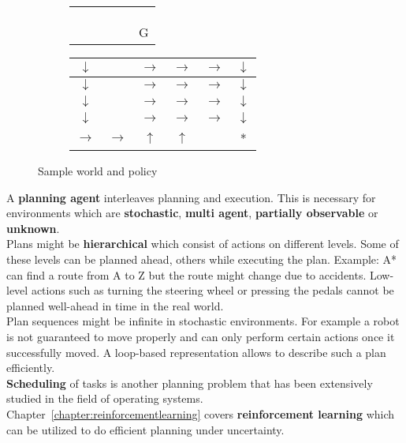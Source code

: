 \documentclass{report}
\begin{document}
\begin{figure}[h!]
\centering
\begin{subfigure}[b]{0.3\textwidth}
\begin{tabular}{|c|c|c|c|c|c|}
\hline
&\cellcolor{black}&&&& \\
\hline
&\cellcolor{black}&&&& \\
\hline
&\cellcolor{black}&&&& \\
\hline
&\cellcolor{black}&&&& \\
\hline
&&&&\cellcolor{black}&G \\
\hline
\end{tabular}
\end{subfigure}
\begin{subfigure}[b]{0.3\textwidth}
\begin{tabular}{|c|c|c|c|c|c|}
\hline
$\downarrow$&&$\rightarrow$&$\rightarrow$&$\rightarrow$&$\downarrow$ \\
\hline
$\downarrow$&&$\rightarrow$&$\rightarrow$&$\rightarrow$&$\downarrow$ \\
\hline
$\downarrow$&&$\rightarrow$&$\rightarrow$&$\rightarrow$&$\downarrow$ \\
\hline
$\downarrow$&&$\rightarrow$&$\rightarrow$&$\rightarrow$&$\downarrow$ \\
\hline
$\rightarrow$&$\rightarrow$&$\uparrow$&$\uparrow$&&* \\
\hline
\end{tabular}
\end{subfigure}
\caption{Sample world and policy}
\label{ref:policy}
\end{figure}

A {\bf planning agent} interleaves planning and execution.
This is necessary for environments which are {\bf stochastic}, {\bf multi agent}, {\bf partially observable} or {\bf unknown}. \\
Plans might be {\bf hierarchical} which consist of actions on different levels. Some of these levels can be planned ahead, others while executing the plan.
Example: A* can find a route from A to Z but the route might change due to accidents.
Low-level actions such as turning the steering wheel or pressing the pedals cannot be planned well-ahead in time in the real world. \\
Plan sequences might be infinite in stochastic environments.
For example a robot is not guaranteed to move properly and can only perform certain actions once it successfully moved.
A loop-based representation allows to describe such a plan efficiently. \\
{\bf Scheduling} of tasks is another planning problem that has been extensively studied in the field of operating systems. \\
Chapter~\ref{chapter:reinforcementlearning} covers {\bf reinforcement learning} which can be utilized to do efficient planning under uncertainty.
\end{document}
